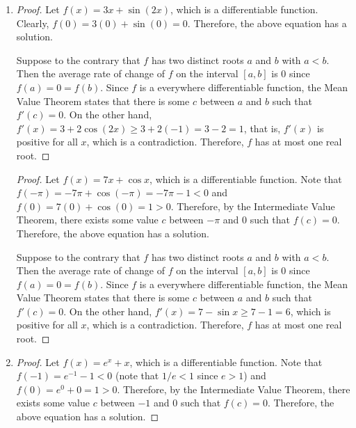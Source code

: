 \documentclass{book}
\begin{document}
\begin{appendices}
\begin{enumerate}[!HW!]
\begin{proof}
Suppose to the contrary that $f$ has two distinct roots $a$ and $b$ with $a< b$. Then the average rate of change of $f$ on the interval $[a,b]$ is 0 since $f(a) = 0 = f(b)$. Since $f$ is a everywhere differentiable function, the Mean Value Theorem states that there is some $c$ between $a$ and $b$ such that $f'(c) = 0$. On the other hand, $f'(x) = 2+\cos x > 2-1 = 1$, which is positive for all $x$, which is a contradiction. Therefore, $f$ has at most one real root.
\end{proof}

\item \begin{proof}
Let $f(x)=3x+\sin(2x)$, which is a differentiable function. Clearly, $f(0) = 3(0)+\sin(0) = 0$. Therefore, the above equation has a solution.

Suppose to the contrary that $f$ has two distinct roots $a$ and $b$ with $a< b$. Then the average rate of change of $f$ on the interval $[a,b]$ is 0 since $f(a) = 0 = f(b)$. Since $f$ is a everywhere differentiable function, the Mean Value Theorem states that there is some $c$ between $a$ and $b$ such that $f'(c) = 0$. On the other hand, $f'(x) = 3+2\cos(2x) \ge 3+2(-1) = 3-2 = 1$, that is, $f'(x)$ is positive for all $x$, which is a contradiction. Therefore, $f$ has at most one real root.
\end{proof}
\itemspade \begin{proof}
Let $f(x)=7x+\cos x$, which is a differentiable function. Note that $f(-\pi) = -7\pi + \cos(-\pi) = -7\pi-1 < 0$ and $f(0) = 7(0) + \cos(0) = 1 > 0$. Therefore, by the Intermediate Value Theorem, there exists some value $c$ between $-\pi$ and $0$ such that $f(c) = 0$. Therefore, the above equation has a solution.

Suppose to the contrary that $f$ has two distinct roots $a$ and $b$ with $a< b$. Then the average rate of change of $f$ on the interval $[a,b]$ is 0 since $f(a) = 0 = f(b)$. Since $f$ is a everywhere differentiable function, the Mean Value Theorem states that there is some $c$ between $a$ and $b$ such that $f'(c) = 0$. On the other hand, $f'(x) = 7-\sin x \ge 7 - 1 = 6$, which is positive for all $x$, which is a contradiction. Therefore, $f$ has at most one real root.
\end{proof}

\item \begin{proof}
Let $f(x)=e^x+x$, which is a differentiable function. Note that $f(-1) = e^{-1}-1 < 0$ (note that  $1/e<1$ since $e>1$) and $f(0) = e^0+0 = 1 > 0$. Therefore, by the Intermediate Value Theorem, there exists some value $c$ between $-1$ and $0$ such that $f(c) = 0$. Therefore, the above equation has a solution.


\end{proof}
\end{enumerate}
\end{appendices}
\end{document}

